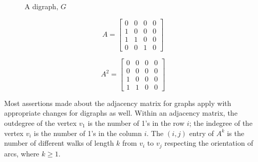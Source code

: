 \begin{minipage}{0.3\textwidth}
    \begin{figure}[H]
        \centering
        \caption{A digraph, $G$}
    \end{figure}
\end{minipage} \hfill
\begin{minipage}{0.3\textwidth}
\begin{equation*}
    A = 
    \begin{bmatrix}
        0 & 0 & 0 & 0 \\
        1 & 0 & 0 & 0 \\
        1 & 1 & 0 & 0 \\
        0 & 0 & 1 & 0 
    \end{bmatrix}
\end{equation*}
\end{minipage}\hfill
\begin{minipage}{0.3\textwidth}
\begin{equation*}
    A^2=
    \begin{bmatrix}
        0 & 0 & 0 & 0 \\
        0 & 0 & 0 & 0 \\
        1 & 0 & 0 & 0 \\
        1 & 1 & 0 & 0
    \end{bmatrix}
\end{equation*}
\end{minipage}\vspace{0.5em}

Most assertions made about the adjacency matrix for graphs apply with appropriate changes for digraphs as well. Within an adjacency matrix, the outdegree of the vertex $v_1$ is the number of 1's in the row $i$; the indegree of the vertex $v_i$ is the number of 1's in the column $i$. The $(i, j)$ entry of $A^k$ is the number of different walks of length $k$ from $v_i$ to $v_j$ respecting the orientation of arcs, where $k \geq 1$. 

